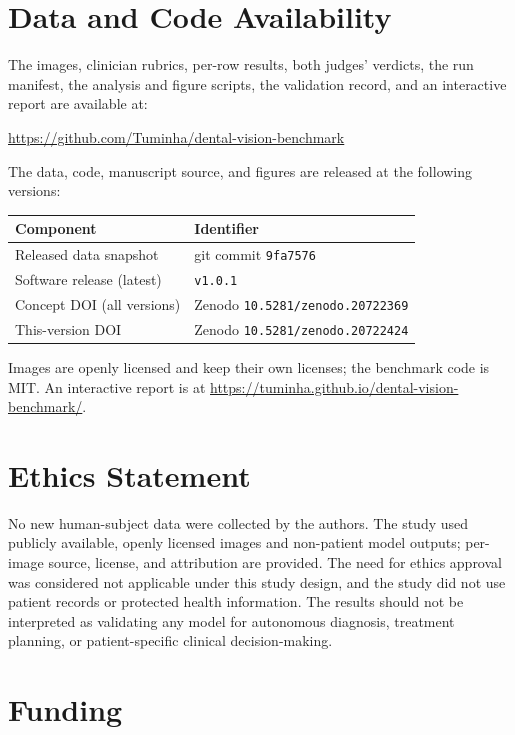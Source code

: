 \documentclass[11pt]{article}
\begin{document}
\section{Data and Code Availability}

The images, clinician rubrics, per-row results, both judges' verdicts, the run manifest, the analysis and figure scripts, the validation record, and an interactive report are available at:
\begin{center}
\url{https://github.com/Tuminha/dental-vision-benchmark}
\end{center}
The data, code, manuscript source, and figures are released at the following versions:
\begin{center}
\begin{tabular}{ll}
\toprule
Component & Identifier \\
\midrule
Released data snapshot & git commit \texttt{9fa7576} \\
Software release (latest) & \texttt{v1.0.1} \\
Concept DOI (all versions) & Zenodo \texttt{10.5281/zenodo.20722369} \\
This-version DOI & Zenodo \texttt{10.5281/zenodo.20722424} \\
\bottomrule
\end{tabular}
\end{center}
Images are openly licensed and keep their own licenses; the benchmark code is MIT. An interactive report is at \url{https://tuminha.github.io/dental-vision-benchmark/}.

\section{Ethics Statement}

No new human-subject data were collected by the authors. The study used publicly available, openly licensed images and non-patient model outputs; per-image source, license, and attribution are provided. The need for ethics approval was considered not applicable under this study design, and the study did not use patient records or protected health information. The results should not be interpreted as validating any model for autonomous diagnosis, treatment planning, or patient-specific clinical decision-making.

\section{Funding}
\end{document}
